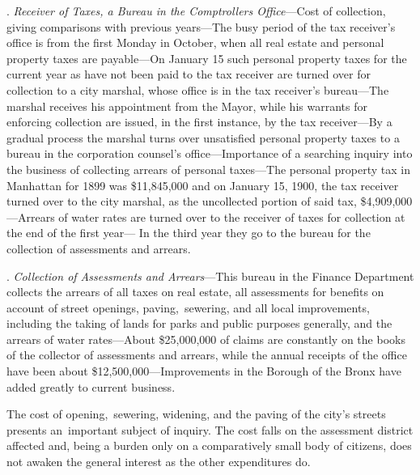 \documentclass[openany,nobib]{tufte-book}
\begin{document}
. \emph{Receiver of Taxes, a Bureau in the
Comptroller\textquotesingle s Office}---Cost of collection, giving
comparisons with previous years---The busy period of the tax receiver's
office is from the first Monday in October, when all real estate and
personal property taxes are payable---On January 15 such personal
property taxes for the current year as have not been paid to the tax
receiver are turned over for collection to a city marshal, whose office
is in the tax receiver's bureau---The marshal receives his appointment
from the Mayor, while his warrants for enforcing collection are issued,
in the first instance, by the tax receiver---By a gradual process the
marshal turns over unsatisfied personal property taxes to a bureau in
the corporation counsel's office---Importance of a searching inquiry
into the business of collecting arrears of personal taxes---The personal
property tax in Manhattan for 1899 was \$11,845,000 and on January 15,
1900, the tax receiver turned over to the city marshal, as the
uncollected portion of said tax, \$4,909,000---Arrears of water rates
are turned over to the receiver of taxes for collection at the end of
the first year--- In the third year they go to the bureau for the
collection of assessments and arrears.~

\vspace{.15in}

\newpage{}. \emph{Collection of Assessments and Arrears}---This bureau in the
Finance Department collects the arrears of all taxes on real estate, all
assessments for benefits on account of street openings,
paving,~sewering, and all local improvements, including the taking of
lands for parks and public purposes generally, and the arrears of water
rates---About \$25,000,000 of claims are constantly on the books of the
collector of assessments and arrears, while the annual receipts of the
office have been about \$12,500,000---Improvements in the Borough of the
Bronx have added greatly to current business.~

The cost of opening,~sewering, widening, and the paving of the city's
streets presents an~important subject of inquiry. The cost falls on the
assessment district affected and, being a burden only on a comparatively
small body of citizens, does not awaken the general interest as the
other expenditures do.~

\vspace{.15in}
\end{document}

